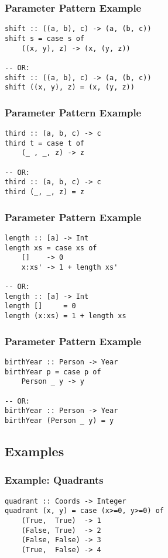 \documentclass[dvipsnames]{beamer}
\theoremstyle{plain}
\begin{document}
\begin{frame}[fragile]
  \frametitle{Parameter Pattern Example}

  \begin{lstlisting}
shift :: ((a, b), c) -> (a, (b, c))
shift s = case s of
    ((x, y), z) -> (x, (y, z))

-- OR:
shift :: ((a, b), c) -> (a, (b, c))
shift ((x, y), z) = (x, (y, z))
  \end{lstlisting}
\end{frame}

\begin{frame}[fragile]
  \frametitle{Parameter Pattern Example}

  \begin{lstlisting}
third :: (a, b, c) -> c
third t = case t of
    (_ , _, z) -> z

-- OR:
third :: (a, b, c) -> c
third (_, _, z) = z
  \end{lstlisting}
\end{frame}

\begin{frame}[fragile]
  \frametitle{Parameter Pattern Example}

  \begin{lstlisting}[deletekeywords={length}]
length :: [a] -> Int
length xs = case xs of
    []    -> 0
    x:xs' -> 1 + length xs'

-- OR:
length :: [a] -> Int
length []     = 0
length (x:xs) = 1 + length xs
  \end{lstlisting}
\end{frame}

\begin{frame}[fragile]
  \frametitle{Parameter Pattern Example}

  \begin{lstlisting}
birthYear :: Person -> Year
birthYear p = case p of
    Person _ y -> y

-- OR:
birthYear :: Person -> Year
birthYear (Person _ y) = y
  \end{lstlisting}
\end{frame}

\subsection{Examples}

\begin{frame}[fragile]
  \frametitle{Example: Quadrants}

  \begin{lstlisting}
quadrant :: Coords -> Integer
quadrant (x, y) = case (x>=0, y>=0) of
    (True,  True)  -> 1
    (False, True)  -> 2
    (False, False) -> 3
    (True,  False) -> 4
  \end{lstlisting}
\end{frame}
\end{document}

